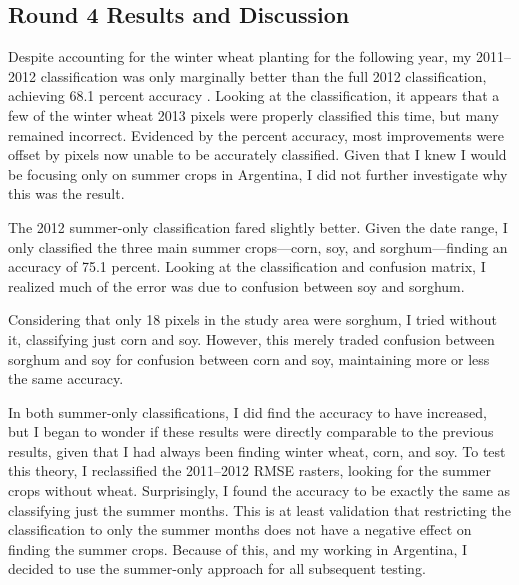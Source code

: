 \subsection*{Round 4 Results and Discussion}

Despite accounting for the winter wheat planting for the following year, my 2011--2012 classification was only marginally better than the full 2012 classification, achieving 68.1 percent accuracy . Looking at the classification, it appears that a few of the winter wheat 2013 pixels were properly classified this time, but many remained incorrect. Evidenced by the percent accuracy, most improvements were offset by pixels now unable to be accurately classified. Given that I knew I would be focusing only on summer crops in Argentina, I did not further investigate why this was the result.

The 2012 summer-only classification fared slightly better. Given the date range, I only classified the three main summer crops---corn, soy, and sorghum---finding an accuracy of 75.1 percent. Looking at the classification and confusion matrix, I realized much of the error was due to confusion between soy and sorghum. %

Considering that only 18 pixels in the study area were sorghum, I tried without it, classifying just corn and soy. However, this merely traded confusion between sorghum and soy for confusion between corn and soy, maintaining more or less the same accuracy. %

In both summer-only classifications, I did find the accuracy to have increased, but I began to wonder if these results were directly comparable to the previous results, given that I had always been finding winter wheat, corn, and soy. To test this theory, I reclassified the 2011--2012 RMSE rasters, looking for the summer crops without wheat. Surprisingly, I found the accuracy to be exactly the same as classifying just the summer months. %
This is at least validation that restricting the classification to only the summer months does not have a negative effect on finding the summer crops. Because of this, and my working in Argentina, I decided to use the summer-only approach for all subsequent testing.

